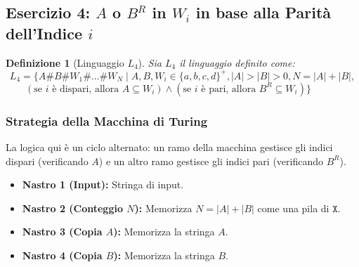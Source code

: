 \documentclass[a4paper]{article}
\newtheorem{definition}{Definizione}
\newcommand{\Sh}{\texttt{\#}} %
\newcommand{\X}{\texttt{X}} %
\begin{document}
\subsection{Esercizio 4: $A$ o $B^R$ in $W_i$ in base alla Parità dell'Indice $i$}

\begin{definition}[Linguaggio $L_4$]
Sia $L_4$ il linguaggio definito come:
\[
L_4 = \{A\Sh B\Sh W_1 \Sh \dots \Sh W_N \mid A, B, W_i \in \{a,b,c,d\}^+, |A|>|B|>0, N=|A|+|B|, 
\]
$\qquad (\text{se } i \text{ è dispari, allora } A \subseteq W_i) \land (\text{se } i \text{ è pari, allora } B^R \subseteq W_i) \}$
\end{definition}

\subsubsection{Strategia della Macchina di Turing}
La logica qui è un ciclo alternato: un ramo della macchina gestisce gli indici dispari (verificando $A$) e un altro ramo gestisce gli indici pari (verificando $B^R$).
\begin{itemize}
    \item \textbf{Nastro 1 (Input):} Stringa di input.
    \item \textbf{Nastro 2 (Conteggio $N$):} Memorizza $N = |A| + |B|$ come una pila di $\X$.
    \item \textbf{Nastro 3 (Copia $A$):} Memorizza la stringa $A$.
    \item \textbf{Nastro 4 (Copia $B$):} Memorizza la stringa $B$.
\end{itemize}
\end{document}
